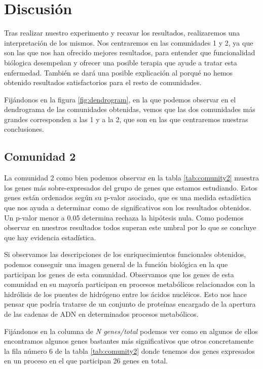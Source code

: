 \section{Discusión}

Tras realizar nuestro experimento y recavar los resultados, realizaremos una interpretación de los mismos. Nos centraremos en las comunidades 1 y 2, ya que son las que nos han ofrecido mejores resultados, para entender que funcionalidad biólogica desempeñan y ofrecer una posible terapia que ayude a tratar esta enfermedad. También se dará una posible explicación al porqué no hemos obtenido resultados satisfactorios para el resto de comunidades.

Fijándonos en la figura \ref{fig:dendrogram}, en la que podemos observar en el dendrograma de las comunidades obtenidas, vemos que las dos comunidades más grandes corresponden a las 1 y a la 2, que son en las que centraremos nuestras conclusiones.

\subsection{Comunidad 2}

La comunidad 2 como bien podemos observar en la tabla \ref{tab:comunity2} muestra los genes más sobre-expresados del grupo de genes que estamos estudiando. Estos genes están ordenados según su p-valor asociado, que es una medida estadística que nos ayuda a determinar como de significativos son los resultados obtenidos. Un p-valor menor a 0.05 determina rechaza la hipótesis nula. Como podemos observar en nuestros resultados todos superan este umbral por lo que se concluye que hay evidencia estadística. 

Si observamos las descripciones de los enriquecimientos funcionales obtenidos, podemos conseguir una imagen general de la función biológica en la que participan los genes de esta comunidad. Observamos que los genes de esta comunidad en su mayoría participan en procesos metabólicos relacionados con la hidrólisis de los puentes de hidrógeno entre los ácidos nucléicos. Esto nos hace pensar que podría tratarse de un conjunto de proteínas encargado de la apertura de las cadenas de ADN en determinados procesos metabólicos.

Fijándonos en la columna de \textit{N genes/total} podemos ver como en algunos de ellos encontramos algunos genes bastantes más significativos que otros concretamente la fila número 6 de la tabla \ref{tab:comunity2} donde tenemos dos genes expresados en un proceso en el que participan 26 genes en total.

